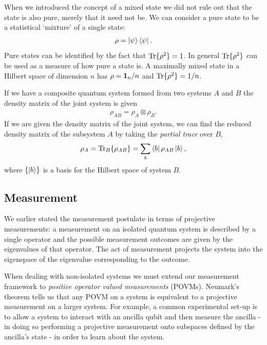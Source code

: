 When we introduced the concept of a mixed state we did not rule out that the state is also pure, merely that it need not be. We can consider a pure state to be a statistical `mixture' of a single state:
\begin{align}
  \rho = \left\vert\psi\right\rangle\left\langle \psi\right\vert.
\end{align}
Pure states can be identified by the fact that $\operatorname{Tr}\{\rho^2\} = 1$. In general $\operatorname{Tr}\{\rho^2\}$ can be used as a measure of how pure a state is. A maximally mixed state in a Hilbert space of dimension $n$ has $\rho = \mathbf{1}_n/n$ and $\operatorname{Tr}\{\rho^2\} = 1/n$.

If we have a composite quantum system formed from two systems $A$ and $B$ the density matrix of the joint system is given
\begin{align}
  \rho_{AB} = \rho_A \otimes \rho_B. 
\end{align}
If we are given the density matrix of the joint system, we can find the reduced density matrix of the subsystem $A$ by taking the \textit{partial trace} over $B$,
\begin{align}
  \rho_A = \operatorname{Tr}_B\{\rho_{AB}\} = \sum_b \left\langle b\right\vert\rho_{AB}\left\vert b\right\rangle,
\end{align}
where $\{\left\vert b\right\rangle\}$ is a basis for the Hilbert space of system $B$. 

\subsection{Measurement}

We earlier stated the measurement postulate in terms of projective measurements: a measurement on an isolated quantum system is described by a single operator and the possible measurement outcomes are given by the eigenvalues of that operator. The act of measurement projects the system into the eigenspace of the eigenvalue corresponding to the outcome. 

When dealing with non-isolated systems we must extend our measurement framework to \textit{positive operator valued measurements} (POVMs). Neumark's theorem \cite{peres} tells us that any POVM on a system is equivalent to a projective measurement on a larger system. For example, a common experimental set-up is to allow a system to interact with an ancilla qubit and then measure the ancilla - in doing so performing a projective measurement onto subspaces defined by the ancilla's state - in order to learn about the system.


